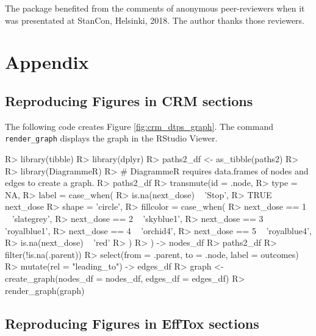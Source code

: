 \documentclass[article]{jss}
\begin{document}
The  package benefited from the comments of anonymous
peer-reviewers when it was presentated at StanCon, Helsinki, 2018. The
author thanks those reviewers.

\hypertarget{appendix}{%
\section{Appendix}\label{appendix}}

\hypertarget{reproducing-figures-in-crm-sections}{%
\subsection{Reproducing Figures in CRM
sections}\label{reproducing-figures-in-crm-sections}}

The following code creates Figure \ref{fig:crm_dtps_graph}. The command
\texttt{render\_graph} displays the graph in the RStudio Viewer.

\begin{CodeChunk}

\begin{CodeInput}
R> library(tibble)
R> library(dplyr)
R> paths2_df <- as_tibble(paths2)
R> 
R> library(DiagrammeR)
R> # DiagrammeR requires data.frames of nodes and edges to create a graph.
R> paths2_df %
R>   transmute(id = .node,
R>             type = NA,
R>             label = case_when(
R>               is.na(next_dose) ~ 'Stop',
R>               TRUE ~ next_dose %
R>             shape = 'circle',
R>             fillcolor = case_when(
R>               next_dose == 1 ~ 'slategrey',
R>               next_dose == 2 ~ 'skyblue1',
R>               next_dose == 3 ~ 'royalblue1',
R>               next_dose == 4 ~ 'orchid4',
R>               next_dose == 5 ~ 'royalblue4',
R>               is.na(next_dose) ~ 'red'
R>             )
R>   ) -> nodes_df
R> paths2_df %
R>   filter(!is.na(.parent)) %
R>   select(from = .parent, to = .node, label = outcomes) %
R>   mutate(rel = "leading_to") -> edges_df
R> graph <- create_graph(nodes_df = nodes_df, edges_df = edges_df)
R> render_graph(graph)
\end{CodeInput}
\end{CodeChunk}

\hypertarget{reproducing-figures-in-efftox-sections}{%
\subsection{Reproducing Figures in EffTox
sections}\label{reproducing-figures-in-efftox-sections}}
\end{document}
